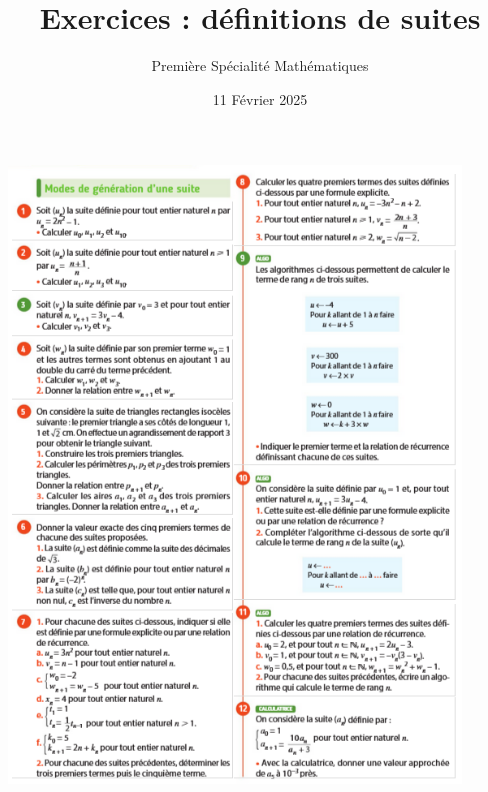 \documentclass{article}
\title{Exercices : définitions de suites}
\author{Première Spécialité Mathématiques}
\date{11 Février 2025}
\begin{document}
\maketitle

\begin{center}
\includegraphics[width=0.9\textwidth]{Suites_definition.png}
\end{center}
\end{document}
